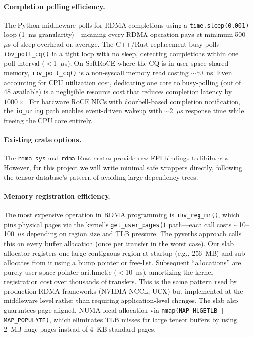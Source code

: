 \documentclass[11pt,letterpaper]{article}
\begin{document}
\paragraph{Completion polling efficiency.}
The Python middleware polls for RDMA completions using a \texttt{time.sleep(0.001)} loop (1~ms granularity)---meaning every RDMA operation pays at minimum 500~$\mu$s of sleep overhead on average. The C++/Rust replacement busy-polls \texttt{ibv\_poll\_cq()} in a tight loop with no sleep, detecting completions within one poll interval ($<$1~$\mu$s). On SoftRoCE where the CQ is in user-space shared memory, \texttt{ibv\_poll\_cq()} is a non-syscall memory read costing ${\sim}$50~ns. Even accounting for CPU utilization cost, dedicating one core to busy-polling (out of 48 available) is a negligible resource cost that reduces completion latency by $1000\times$. For hardware RoCE NICs with doorbell-based completion notification, the \texttt{io\_uring} path enables event-driven wakeup with ${\sim}$2~$\mu$s response time while freeing the CPU core entirely.

\paragraph{Existing crate options.}
The \texttt{rdma-sys} and \texttt{rdma} Rust crates provide raw FFI bindings to libibverbs. However, for this project we will write minimal safe wrappers directly, following the tensor database's pattern of avoiding large dependency trees.

\paragraph{Memory registration efficiency.}
The most expensive operation in RDMA programming is \texttt{ibv\_reg\_mr()}, which pins physical pages via the kernel's \texttt{get\_user\_pages()} path---each call costs ${\sim}$10--100~$\mu$s depending on region size and TLB pressure. The pyverbs approach calls this on every buffer allocation (once per transfer in the worst case). Our slab allocator registers one large contiguous region at startup (e.g., 256~MB) and sub-allocates from it using a bump pointer or free-list. Subsequent ``allocations'' are purely user-space pointer arithmetic ($<$10~ns), amortizing the kernel registration cost over thousands of transfers. This is the same pattern used by production RDMA frameworks (NVIDIA NCCL, UCX) but implemented at the middleware level rather than requiring application-level changes. The slab also guarantees page-aligned, NUMA-local allocation via \texttt{mmap(MAP\_HUGETLB | MAP\_POPULATE)}, which eliminates TLB misses for large tensor buffers by using 2~MB huge pages instead of 4~KB standard pages.
\end{document}
